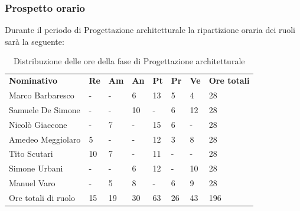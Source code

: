 \subsubsection{Prospetto orario}
Durante il periodo di Progettazione architetturale la ripartizione oraria dei ruoli sarà la seguente:
\begin{center}
    \begin{table}[ht!]
        \centering
        \caption{Distribuzione delle ore della fase di Progettazione architetturale}
        \vspace{5px}
        \renewcommand{\arraystretch}{1.8}
        \begin{tabular}{p{100px} p{20px} p{20px} p{20px} p{20px} p{20px} p{20px} p{50px} }
            \rowcolor{logo!70} \textbf{Nominativo} & \textbf{Re} & \textbf{Am} & \textbf{An} & \textbf{Pt} & \textbf{Pr} & \textbf{Ve} & \textbf{Ore totali} \\
            Marco Barbaresco                       & -           & -           & 6           & 13          & 5           & 4           & 28                  \\
            Samuele De Simone                      & -           & -           & 10          & -           & 6           & 12          & 28                  \\
            Nicolò Giaccone                        & -           & 7           & -           & 15          & 6           & -           & 28                  \\
            Amedeo Meggiolaro                      & 5           & -           & -           & 12          & 3           & 8           & 28                  \\
            Tito Scutari                           & 10          & 7           & -           & 11          & -           & -           & 28                  \\
            Simone Urbani                          & -           & -           & 6           & 12          & -           & 10          & 28                  \\
            Manuel Varo                            & -           & 5           & 8           & -           & 6           & 9           & 28                  \\
            Ore totali di ruolo                    & 15          & 19          & 30          & 63          & 26          & 43          & 196                 \\
        \end{tabular}
    \end{table}
\end{center}
\pagebreak

